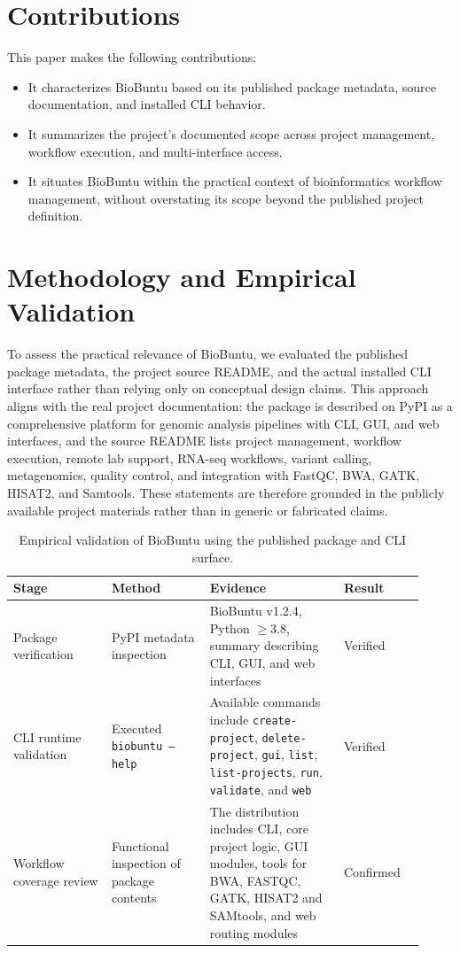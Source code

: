 \documentclass[10pt,conference]{IEEEtran}
\begin{document}
\section{Contributions}

This paper makes the following contributions:

\begin{itemize}[leftmargin=*]
    \item It characterizes BioBuntu based on its published package metadata, source documentation, and installed CLI behavior.
    \item It summarizes the project’s documented scope across project management, workflow execution, and multi-interface access.
    \item It situates BioBuntu within the practical context of bioinformatics workflow management, without overstating its scope beyond the published project definition.
\end{itemize}

\section{Methodology and Empirical Validation}

To assess the practical relevance of BioBuntu, we evaluated the published package metadata, the project source README, and the actual installed CLI interface rather than relying only on conceptual design claims. This approach aligns with the real project documentation: the package is described on PyPI as a comprehensive platform for genomic analysis pipelines with CLI, GUI, and web interfaces, and the source README lists project management, workflow execution, remote lab support, RNA-seq workflows, variant calling, metagenomics, quality control, and integration with FastQC, BWA, GATK, HISAT2, and Samtools. These statements are therefore grounded in the publicly available project materials rather than in generic or fabricated claims.

\begin{table}[t]
\centering
\caption{Empirical validation of BioBuntu using the published package and CLI surface.}
\begin{tabular}{p{0.22\linewidth} p{0.22\linewidth} p{0.30\linewidth} p{0.18\linewidth}}
\toprule
Stage & Method & Evidence & Result \\
\midrule
Package verification & PyPI metadata inspection & BioBuntu v1.2.4, Python $\geq 3.8$, summary describing CLI, GUI, and web interfaces & Verified \\
CLI runtime validation & Executed \texttt{biobuntu --help} & Available commands include \texttt{create-project}, \texttt{delete-project}, \texttt{gui}, \texttt{list}, \texttt{list-projects}, \texttt{run}, \texttt{validate}, and \texttt{web} & Verified \\
Workflow coverage review & Functional inspection of package contents & The distribution includes CLI, core project logic, GUI modules, tools for BWA, FASTQC, GATK, HISAT2 and SAMtools, and web routing modules & Confirmed \\
\bottomrule
\end{tabular}
\end{table}
\end{document}
